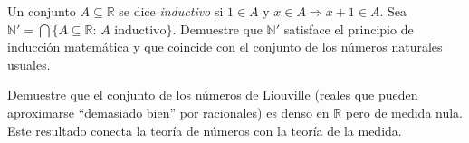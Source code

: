 \begin{problem}
Un conjunto $A\subseteq\mathbb{R}$ se dice \emph{inductivo} si $1\in A$ y $x\in A\Rightarrow x+1\in A$. Sea $\mathbb{N}'=\bigcap\{A\subseteq\mathbb{R}:\,A\text{ inductivo}\}$. Demuestre que $\mathbb{N}'$ satisface el principio de inducción matemática y que coincide con el conjunto de los números naturales usuales.
\end{problem}

\begin{problem}
Demuestre que el conjunto de los números de Liouville (reales que pueden aproximarse ``demasiado bien'' por racionales) es denso en $\mathbb{R}$ pero de medida nula. Este resultado conecta la teoría de números con la teoría de la medida.
\end{problem}
